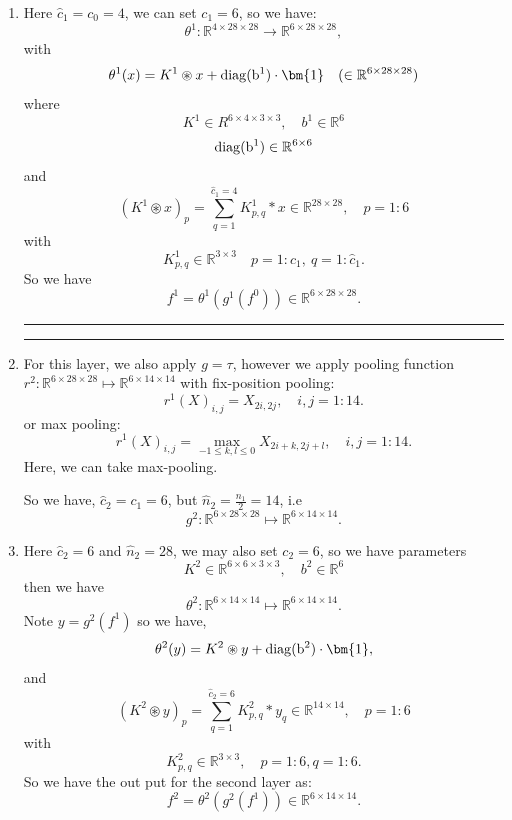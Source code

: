 \begin{enumerate}
	\item Here $\hat c_1 = c_0 = 4$, we can set $c_1 = 6$, so we have:
	\begin{equation}
	\theta^1 : \mathbb R^{4\times 28 \times 28} \to \mathbb R^{6 \times 28 \times28},
	\end{equation}
	with 
	\begin{equation}
	\theta^1(x) = K^1 \circledast x + {\rm{diag}(b^1)} \cdot \bm{1} \quad (\in
	\mathbb R^{6\times 28\times 28})
	\end{equation}
	where 
	$$
	K^1 \in R^{6 \times 4 \times 3 \times 3}, \quad b^1 \in \mathbb R^{6}
	$$
	$$
	\rm{diag}(b^1) 
	\in \mathbb R^{6\times 6}
	$$
	and 
	\begin{equation}
	(K^1 \circledast x)_p = \sum_{q = 1}^{\hat c_1 = 4} K^1_{p,q}\ast x \in \mathbb R^{28 \times 28}, \quad p = 1:6
	\end{equation}
	with 
	$$
	K^1_{p,q} \in \mathbb R^{3 \times 3} \quad p = 1: c_1, ~  q = 1: \hat c_1 .
	$$
	So we have 
	\begin{equation}
	f^1 = \theta^1( g^1(f^0))  \in \mathbb R^{6 \times 28 \times 28}.
	\end{equation}
	
	\bigskip \hrule \bigskip  
	\bigskip \hrule \bigskip  
	\item For this layer, we also apply $g = \tau$, however we apply pooling function $r^2: \mathbb R^{6 \times 28 \times 28} \mapsto \mathbb R^{6 \times 14 \times14} $ with fix-position pooling:
	$$
	r^1(X)_{i,j} = X_{2i, 2j}, \quad  i, j = 1:14.
	$$ 
	or max pooling:
	$$
	r^1(X)_{i,j} = \max_{-1 \le k,l \le 0}X_{2i+k, 2j+l}, \quad i , j = 1:14.
	$$
	Here, we can take max-pooling. 
	
	So we have, $\hat c_2 = c_1 = 6$, but $\hat n_2 = \frac{ n_1}{2} = 14$, i.e
	\begin{equation}
	g^2: \mathbb R^{6 \times 28 \times 28} \mapsto \mathbb R^{6\times 14 \times 14}.
	\end{equation}
	
	\item Here $\hat c_2 = 6$ and $\hat n_2 = 28$, we may also set $c_2 = 6$, so we have parameters 
	$$
	K^2 \in \mathbb R^{6 \times 6 \times 3 \times 3},\quad b^2 \in \mathbb R^{6}
	$$
	then we have 
	\begin{equation}
	\theta^2: \mathbb R^{6 \times 14 \times 14} \mapsto \mathbb R^{6 \times 14 \times 14}.
	\end{equation}
	Note $y = g^2 (f^1)$ so we have,
	\begin{equation}
	\theta^2(y) = K^2 \circledast y + {\rm{diag}(b^2)} \cdot \bm{1}, 
	\end{equation}
	and 
	\begin{equation}
	(K^2 \circledast y)_p = \sum_{q = 1}^{\hat c_2 = 6} K^2_{p,q} \ast y_q \in \mathbb R^{14 \times 14}, \quad p = 1:6
	\end{equation}
	with 
	$$
	K^2_{p,q} \in \mathbb R^{3 \times 3},\quad p = 1:6, q = 1:6.
	$$
	So we have the out put for the second layer as:
	\begin{equation}
	f^2 = \theta^2(g^2(f^1)) \in \mathbb R^{6 \times 14 \times 14}.
	\end{equation}
	

\end{enumerate}
